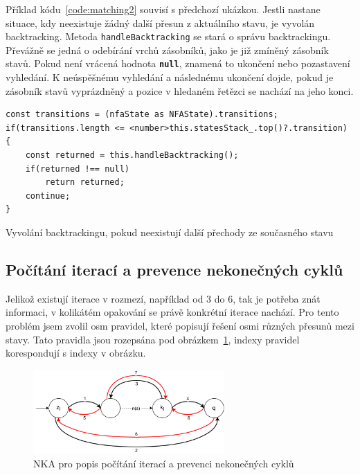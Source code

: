 Příklad kódu~\ref{code:matching2} souvisí s předchozí ukázkou. 
Jestli nastane situace, kdy neexistuje žádný další přesun z aktuálního stavu, je vyvolán backtracking.
Metoda \texttt{handleBacktracking} se stará o správu backtrackingu.
Převážně se jedná o odebírání vrchů zásobníků, jako je již zmíněný zásobník stavů.
Pokud není vrácená hodnota \texttt{\textbf{null}}, znamená to ukončení nebo pozastavení vyhledání.
K neúspěšnému vyhledání a následnému ukončení dojde, pokud je zásobník stavů vyprázdněný a pozice v hledaném řetězci se nachází na jeho konci.

\begin{code}[!ht]
	\begin{verbatim}
const transitions = (nfaState as NFAState).transitions;
if(transitions.length <= <number>this.statesStack_.top()?.transition)
{
	const returned = this.handleBacktracking();
	if(returned !== null) 
		return returned;
	continue;
}
	\end{verbatim}
	\caption{Vyvolání backtrackingu, pokud neexistují další přechody ze současného stavu}
	\label{code:matching2}
\end{code}


\subsection*{Počítání iterací a prevence nekonečných cyklů}

Jelikož existují iterace v rozmezí, například od 3 do 6, tak je potřeba znát informaci, v kolikátém opakování se právě konkrétní iterace nachází.
Pro tento problém jsem zvolil osm pravidel, které popisují řešení osmi různých přesunů mezi stavy.
Tato pravidla jsou rozepsána pod obrázkem~\ref{fig:ITERCNT}, indexy pravidel korespondují s indexy v obrázku.


\begin{figure}[!h]
	\centering
	\includegraphics[width=0.65\textwidth]{Figures/IterationCount.pdf}
	\caption{NKA pro popis počítání iterací a prevenci nekonečných cyklů}
	\label{fig:ITERCNT}
\end{figure}

